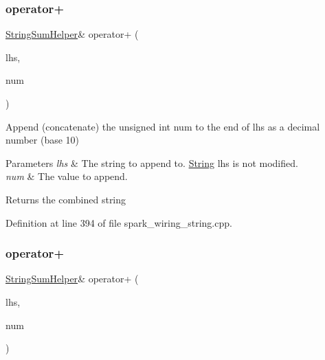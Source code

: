 \mbox{\label{class_string_a20c7726a6ea2c053044c19f40e5c91aa}} 
\subsubsection{\texorpdfstring{operator+}{operator+}\hspace{0.1cm}{\footnotesize\ttfamily [6/10]}}
{\footnotesize\ttfamily \hyperlink{class_string_sum_helper}{String\+Sum\+Helper}\& operator+ (\begin{DoxyParamCaption}\item[{const \hyperlink{class_string_sum_helper}{String\+Sum\+Helper} \&}]{lhs,  }\item[{unsigned int}]{num }\end{DoxyParamCaption})\hspace{0.3cm}{\ttfamily [friend]}}



Append (concatenate) the unsigned int num to the end of lhs as a decimal number (base 10) 


\begin{DoxyParams}{Parameters}
{\em lhs} & The string to append to. \hyperlink{class_string}{String} lhs is not modified.\\
\hline
{\em num} & The value to append.\\
\hline
\end{DoxyParams}
\begin{DoxyReturn}{Returns}
the combined string 
\end{DoxyReturn}


Definition at line 394 of file spark\+\_\+wiring\+\_\+string.\+cpp.

\mbox{\label{class_string_a50aa43ee66fafd4a7e03c453a62aaac1}} 
\subsubsection{\texorpdfstring{operator+}{operator+}\hspace{0.1cm}{\footnotesize\ttfamily [7/10]}}
{\footnotesize\ttfamily \hyperlink{class_string_sum_helper}{String\+Sum\+Helper}\& operator+ (\begin{DoxyParamCaption}\item[{const \hyperlink{class_string_sum_helper}{String\+Sum\+Helper} \&}]{lhs,  }\item[{long}]{num }\end{DoxyParamCaption})\hspace{0.3cm}{\ttfamily [friend]}}



